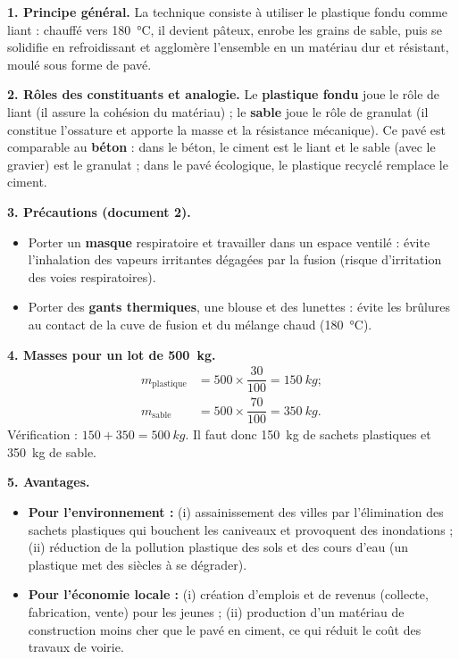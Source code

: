 \documentclass[11pt]{article}
\newcommand{\cle}[1]{{\popxbold\color{popdark}#1}}
\begin{document}
\begin{corrige}
\textbf{1. Principe général.} La technique consiste à utiliser le plastique fondu comme \cle{liant} : chauffé vers \SI{180}{\celsius}, il devient pâteux, enrobe les grains de sable, puis se solidifie en refroidissant et agglomère l'ensemble en un matériau dur et résistant, moulé sous forme de pavé.

\textbf{2. Rôles des constituants et analogie.} Le \textbf{plastique fondu} joue le rôle de liant (il assure la cohésion du matériau) ; le \textbf{sable} joue le rôle de \cle{granulat} (il constitue l'ossature et apporte la masse et la résistance mécanique). Ce pavé est comparable au \textbf{béton} : dans le béton, le ciment est le liant et le sable (avec le gravier) est le granulat ; dans le pavé écologique, le plastique recyclé remplace le ciment.

\textbf{3. Précautions (document 2).}
\begin{itemize}
\item Porter un \textbf{masque} respiratoire et travailler dans un espace ventilé : évite l'inhalation des vapeurs irritantes dégagées par la fusion (risque d'irritation des voies respiratoires).
\item Porter des \textbf{gants thermiques}, une blouse et des lunettes : évite les brûlures au contact de la cuve de fusion et du mélange chaud (\SI{180}{\celsius}).
\end{itemize}

\textbf{4. Masses pour un lot de \SI{500}{kg}.}
\begin{align*}
m_{\text{plastique}} &= 500 \times \dfrac{30}{100} = \SI{150}{kg} ;\\
m_{\text{sable}} &= 500 \times \dfrac{70}{100} = \SI{350}{kg}.
\end{align*}
Vérification : $150 + 350 = \SI{500}{kg}$. Il faut donc \SI{150}{kg} de sachets plastiques et \SI{350}{kg} de sable.

\textbf{5. Avantages.}
\begin{itemize}
\item \textbf{Pour l'environnement :} (i) assainissement des villes par l'élimination des sachets plastiques qui bouchent les caniveaux et provoquent des inondations ; (ii) réduction de la pollution plastique des sols et des cours d'eau (un plastique met des siècles à se dégrader).
\item \textbf{Pour l'économie locale :} (i) création d'emplois et de revenus (collecte, fabrication, vente) pour les jeunes ; (ii) production d'un matériau de construction moins cher que le pavé en ciment, ce qui réduit le coût des travaux de voirie.
\end{itemize}


\end{corrige}
\end{document}
